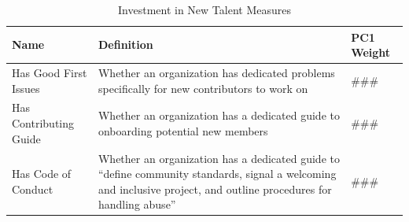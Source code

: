 \begin{longtable}{>{\raggedright\arraybackslash}p{} p{}p{}}
\caption{Investment in New Talent Measures}\label{tab:investment_new_talent_metrics}\\
\toprule
\textbf{Name} & \textbf{Definition}  & \textbf{PC1 Weight} \\
\midrule
\endfirsthead




\bottomrule
\endlastfoot
Has Good First Issues & Whether an organization has dedicated problems specifically for new contributors to work on & ###\\
Has Contributing Guide & Whether an organization has a dedicated guide to onboarding potential new members & ### \\
Has Code of Conduct & Whether an organization has a dedicated guide to ``define community standards, signal a welcoming and inclusive project, and outline procedures for handling abuse'' \citep{github_adding_2025} & ### \\
\end{longtable}

\vspace{-0.5em} %
\begin{minipage}{\textwidth}
\footnotesize
\setlength{\parskip}{0pt}
\setlength{\baselineskip}{0.9\baselineskip}
\end{minipage}
